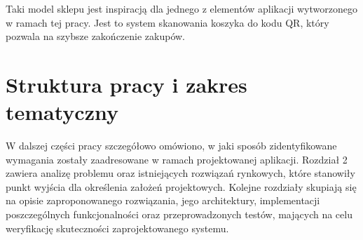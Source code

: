 Taki model sklepu jest inspiracją dla jednego z elementów aplikacji wytworzonego w ramach tej pracy. Jest to system skanowania koszyka do kodu QR, który pozwala na szybsze zakończenie zakupów. 

\section{Struktura pracy i zakres tematyczny}

W dalszej części pracy szczegółowo omówiono, w jaki sposób zidentyfikowane wymagania zostały zaadresowane w ramach projektowanej aplikacji. Rozdział 2 zawiera analizę problemu oraz istniejących rozwiązań rynkowych, które stanowiły punkt wyjścia dla określenia założeń projektowych. Kolejne rozdziały skupiają się na opisie zaproponowanego rozwiązania, jego architektury, implementacji poszczególnych funkcjonalności oraz przeprowadzonych testów, mających na celu weryfikację skuteczności zaprojektowanego systemu.

